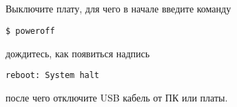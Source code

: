 \subsection{} Выключите плату, для чего в начале введите команду
\begin{lstlisting}[style=bash]
	$ poweroff
\end{lstlisting}
дождитесь, как появиться надпись
\begin{lstlisting}[style=stdout]
	reboot: System halt
\end{lstlisting}
после чего отключите USB кабель от ПК или платы. 